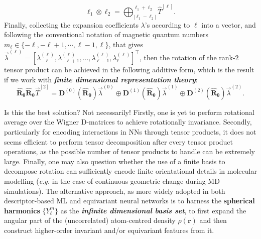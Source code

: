 \begin{myquote}
\begin{equation}
    \label{eq:tensor_prod_decomp_general}
    \ell_1\otimes\ell_2=\bigoplus_{|\ell_1-\ell_2|}^{\ell_1+\ell_2}\hat{T}^{[\ell]}.
\end{equation}
Finally, collecting the expansion coefficients $\lambda$'s according to $\ell$ into a vector, and following the conventional notation of magnetic quantum numbers $m_\ell\in\{-\ell,-\ell+1,\cdots,\ell-1,\ell\}$, that gives $\vec{\lambda}^{(\ell)}=\left[\lambda^{(\ell)}_{-\ell},\lambda^{(\ell)}_{-\ell+1},\ldots,\lambda^{(\ell)}_{\ell-1},\lambda^{(\ell)}_{\ell}\right]^\top$, then the rotation of the rank-2 tensor product can be achieved in the following additive form, which is the result if we work with \textbf{\textit{finite dimensional representation theory}}:
\begin{equation}
    \label{eq:Wigner_D_matrix_rotate_rank_2_tensor}
    \hat{\bm{R}}_{\boldsymbol{\theta}}\hat{\bm{R}}_{\boldsymbol{\theta}}\vec{T}^{[2]} = \bm{D}^{(0)}(\hat{\bm{R}}_{\boldsymbol{\theta}})\vec{\lambda}^{(0)}\oplus \bm{D}^{(1)}(\hat{\bm{R}}_{\boldsymbol{\theta}})\vec{\lambda}^{(1)}\oplus \bm{D}^{(2)}(\hat{\bm{R}}_{\boldsymbol{\theta}})\vec{\lambda}^{(2)}.
\end{equation}

\hspace{10pt} Is this the best solution? Not necessarily! Firstly, one is yet to perform rotational average over the Wigner D-matrices to achieve rotationally invariance. Secondly, particularly for encoding interactions in NNs through tensor products, it does not seems efficient to perform tensor decomposition after every tensor product operations, as the possible number of tensor products to handle can be extremely large. Finally, one may also question whether the use of a finite basis to decompose rotation can sufficiently encode finite orientational details in molecular modelling (\emph{e.g.} in the case of continuous geometric change during MD simulations). The alternative approach, as more widely adopted in both descriptor-based ML\cite{bartok2013representing,drautz2019atomic} and equivariant neural networks\cite{duval2023hitchhiker} is to harness the \textbf{spherical harmonics} $\{Y_{\ell}^{m}\}$ as the \emph{\textbf{infinite dimensional basis set}}, to first expand the angular part of the (uncorrelated) atom-centred density $\rho(\bm{r})$ and then construct higher-order invariant and/or equivariant features from it. 


\end{myquote}
